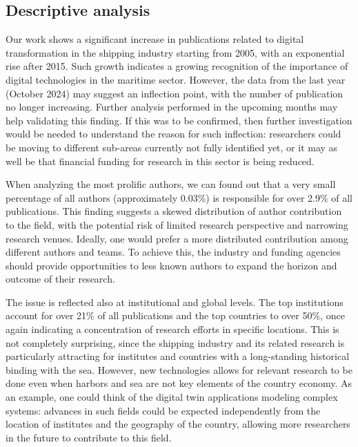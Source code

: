 \documentclass[a4paper, review, endfloat, doubleblind, authoryear]{elsarticle}
\begin{document}
	\subsection{Descriptive analysis}	
	Our work shows a significant increase in publications related to digital transformation in the shipping industry starting from 2005, with an exponential rise after 2015. Such growth indicates a growing recognition of the importance of digital technologies in the maritime sector. However, the data from the last year (October 2024) may suggest an inflection point, with the number of publication no longer increasing. Further analysis performed in the upcoming months may help validating this finding. If this was to be confirmed, then further investigation would be needed to understand the reason for such inflection: researchers could be moving to different sub-areas currently not fully identified yet, or it may as well be that financial funding for research in this sector is being reduced.
	
	When analyzing the most prolific authors, we can found out that a very small percentage of all authors (approximately 0.03\%) is responsible for over 2.9\% of all publications. This finding suggests a skewed distribution of author contribution to the field, with the potential risk of limited research perspective and narrowing research venues. Ideally, one would prefer a more distributed contribution among different authors and teams. To achieve this, the industry and funding agencies should provide opportunities to less known authors to expand the horizon and outcome of their research.
	
	The issue is reflected also at institutional and global levels. The top institutions account for over 21\% of all publications and the top countries to over 50\%, once again indicating a concentration of research efforts in specific locations. This is not completely surprising, since the shipping industry and its related research is particularly attracting for institutes and countries with a long-standing historical binding with the sea. However, new technologies allows for relevant research to be done even when harbors and sea are not key elements of the country economy. As an example, one could think of the digital twin applications modeling complex systems: advances in such fields could be expected independently from the location of institutes and the geography of the country, allowing more researchers in the future to contribute to this field.
	
\end{document}
